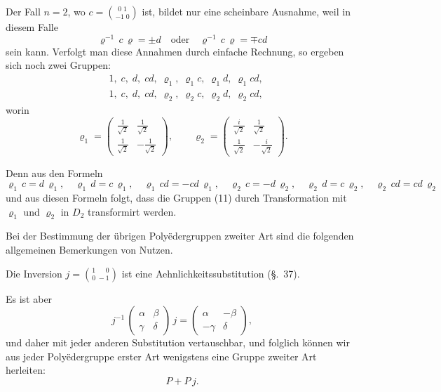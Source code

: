 \documentclass[12pt,a4paper]{article}
\begin{document}
Der Fall $n = 2$, wo $c = \binom{0\;1}{-1\;0}$ ist, bildet nur eine scheinbare Ausnahme, weil in diesem Falle
\begin{equation}\label{eq:62.10}
\tag{10}
\varrho^{-1}\,c\,\varrho = \pm d\quad\text{oder}\quad
\varrho^{-1}\,c\,\varrho = \mp cd
\end{equation}
sein kann. Verfolgt man diese Annahmen durch einfache Rechnung, so ergeben sich noch zwei Gruppen:
\begin{equation}\label{eq:62.11}
\tag{11}
\begin{aligned}
&1,\; c,\; d,\; cd,\; \varrho_{1},\; \varrho_{1}c,\; \varrho_{1}d,\; \varrho_{1}cd,\\
&1,\; c,\; d,\; cd,\; \varrho_{2},\; \varrho_{2}c,\; \varrho_{2}d,\; \varrho_{2}cd,
\end{aligned}
\end{equation}
worin
\[
\varrho_{1} = \begin{pmatrix}\frac{1}{\sqrt{2}}&\frac{1}{\sqrt{2}}\\[-2pt]\frac{1}{\sqrt{2}}&-\frac{1}{\sqrt{2}}\end{pmatrix},\qquad
\varrho_{2} = \begin{pmatrix}\frac{i}{\sqrt{2}}&\frac{1}{\sqrt{2}}\\[-2pt]\frac{1}{\sqrt{2}}&-\frac{i}{\sqrt{2}}\end{pmatrix}.
\]

\newpage
{}

Denn aus den Formeln
\[
\varrho_{1}\,c = d\,\varrho_{1},\quad
\varrho_{1}\,d = c\,\varrho_{1},\quad
\varrho_{1}\,cd = -cd\,\varrho_{1},\quad
\varrho_{2}\,c = -d\,\varrho_{2},\quad
\varrho_{2}\,d = c\,\varrho_{2},\quad
\varrho_{2}\,cd = cd\,\varrho_{2}
\]
und aus diesen Formeln folgt, dass die Gruppen (11) durch Transformation mit $\varrho_{1}$ und $\varrho_{2}$ in $D_{2}$ transformirt werden.

Bei der Bestimmung der übrigen Polyëdergruppen zweiter Art sind die folgenden allgemeinen Bemerkungen von Nutzen.

Die Inversion $j = \binom{1\;\phantom{-}0}{0\;-1}$ ist eine Aehnlichkeitssubstitution (\S.~37).

Es ist aber
\[
j^{-1}\,\begin{pmatrix}\alpha&\beta\\\gamma&\delta\end{pmatrix}\,j
= \begin{pmatrix}\alpha&-\beta\\-\gamma&\delta\end{pmatrix},
\]
und daher mit jeder anderen Substitution vertauschbar, und folglich können wir aus jeder Polyëdergruppe erster Art wenigstens eine Gruppe zweiter Art herleiten:
\begin{equation}\label{eq:62.12}
\tag{12}
P + P\,j.
\end{equation}
\end{document}
